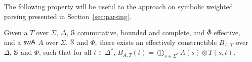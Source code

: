 


\noindent
{}
The following property will be useful to the approach on
symbolic weighted parsing presented in Section~\ref{sec:parsing}.

\begin{proposition} \label{prop:epsilon}
Given a \SWT $T$ over $\Sigma$, $\Delta$,
$\mathbb{S}$ commutative, bounded and complete,
and $\bar\Phi$ effective,
and a $\textsf{swA}$ $A$ over $\Sigma$, $\mathbb{S}$ and $\bar\Phi$,
there exists an effectively constructible \SWA
$B_{A, T}$ over $\Delta$, $\mathbb{S}$ and $\bar\Phi$,
such that for all $t \in \Delta^*$,
$B_{A, T}(t) = \displaystyle\bigoplus_{s\in \Sigma^*} A(s) \otimes T(s, t)$.
\end{proposition}
%
